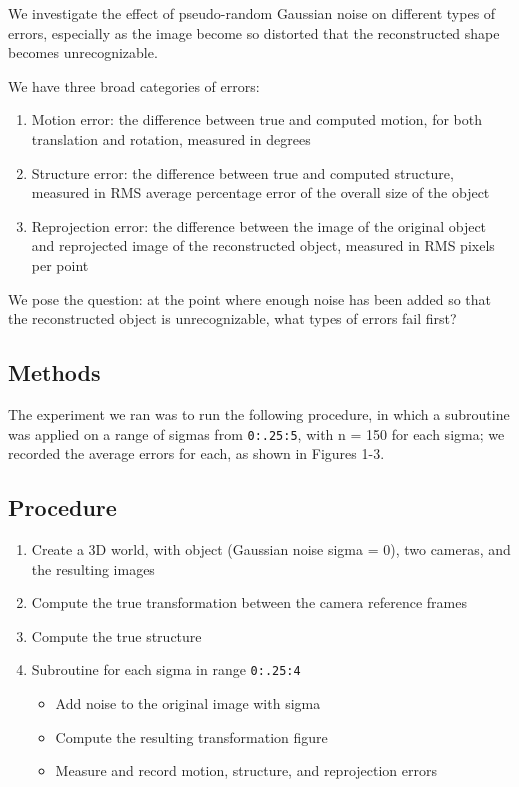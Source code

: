 \documentclass{article}
\begin{document}
We investigate the effect of pseudo-random Gaussian noise on different types of errors, especially as the image become so distorted that the reconstructed shape becomes unrecognizable.

We have three broad categories of errors:

\begin{enumerate}
  \item Motion error: the difference between true and computed motion, for both translation and rotation, measured in degrees
  \item Structure error: the difference between true and computed structure, measured in RMS average percentage error of the overall size of the object
  \item Reprojection error: the difference between the image of the original object and reprojected image of the reconstructed object, measured in RMS pixels per point
\end{enumerate} 

We pose the question: at the point where enough noise has been added so that the reconstructed object is unrecognizable, what types of errors fail first?




\subsection{Methods}

The experiment we ran was to run the following procedure, in which a subroutine was applied on a range of sigmas from \texttt{0:.25:5}, with n = 150 for each sigma; we recorded the average errors for each, as shown in Figures 1-3.

\subsection*{Procedure}

\begin{enumerate}
  \item Create a 3D world, with object (Gaussian noise sigma = 0), two cameras, and the resulting images
  \item Compute the true transformation between the camera reference frames
  \item Compute the true structure
  \item Subroutine for each sigma in range \texttt{0:.25:4}
  \begin{itemize}
  	\item Add noise to the original image with sigma
  	\item Compute the resulting transformation figure
  	\item Measure and record motion, structure, and reprojection errors
  \end{itemize}
\end{enumerate} 
\end{document}
